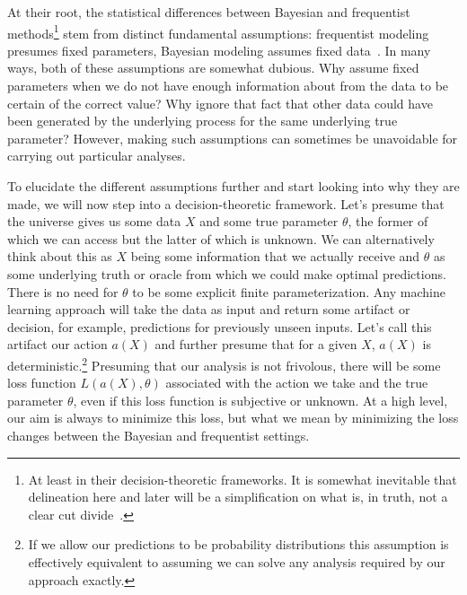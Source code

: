 At their root, the statistical differences between Bayesian and frequentist methods\footnote{At least in their decision-theoretic
frameworks.  It is somewhat inevitable that delineation here and later will be a simplification on what is, in truth, not a clear
cut divide~\citep{gelman2011induction}.}
stem from distinct fundamental
assumptions: frequentist modeling presumes fixed parameters, Bayesian modeling assumes fixed data~\citep{jordan2009you}.  In many ways,
both of these assumptions are somewhat dubious. Why assume fixed parameters when we do not have enough
information about from the data to be certain of the correct value?  Why ignore that fact that other data could have 
been generated by the underlying process for the same underlying true parameter?  However,
making such assumptions can sometimes be unavoidable for carrying out particular analyses.

To elucidate the
different assumptions further and start looking into why they are made, we will now step into a decision-theoretic
framework.  Let's presume that the universe gives us some data $X$ and some true parameter $\theta$, the former of which
we can access but the latter of which is unknown.  We can alternatively think about this as $X$ being some information
that we actually receive and $\theta$ as some underlying truth or oracle from which we could make optimal predictions.  There is
no need for $\theta$ to be some explicit finite parameterization.  Any machine learning approach will take the data as input and
return some artifact or decision, for example, predictions for previously unseen inputs.  
Let's call this artifact our action $a(X)$
and further presume that for a given $X$, $a(X)$ is deterministic.\footnote{If we allow our predictions to be probability
distributions this assumption is effectively equivalent to assuming we can solve any analysis required by our approach exactly.}
Presuming that our analysis is not frivolous, there will be some loss function $L(a(X),\theta)$ associated with the action we take
and the true parameter $\theta$, even if this loss function is subjective or unknown.  At a high level, our aim is always to
minimize this loss, but what we mean by minimizing the loss changes between the Bayesian and frequentist settings.  

